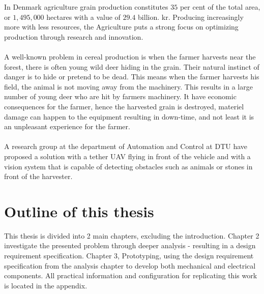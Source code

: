 In Denmark agriculture grain production constitutes $35$ per cent of the total area, or $1,495,000$ hectares with a value of $29.4$ billion. kr. Producing increasingly more with less resources, the Agriculture puts a strong focus on optimizing production through research and innovation\cite{FødevarerLandbrug2013}.
\\
\\
A well-known problem in cereal production is when the farmer harvests near the forest, there is often young wild deer hiding in the grain. Their natural instinct of danger is to hide or pretend to be dead. This means when the farmer harvests his field, the animal is not moving away from the machinery. This results in a large number of young deer who are hit by farmers machinery. It have economic consequences for the farmer, hence the harvested grain is destroyed, materiel damage can happen to the equipment resulting in down-time, and not least it is an unpleasant experience for the farmer.
\\
\\
A research group at the department of Automation and Control at DTU have proposed a solution with a tether UAV flying in front of the vehicle and with a vision system that is capable of detecting obstacles such as animals or stones in front of the harvester.

\section{Outline of this thesis}
This thesis is divided into 2 main chapters, excluding the introduction. Chapter 2 investigate the presented problem through deeper analysis - resulting in a design requirement specification. Chapter 3, Prototyping, using the design requirement specification from the analysis chapter to develop both mechanical and electrical components. All practical information and configuration for replicating this work is located in the appendix.



